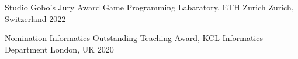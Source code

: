 \begin{cvhonors}
  \cvhonor
    {Studio Gobo's Jury Award} %
    {Game Programming Labaratory, ETH Zurich} %
    {Zurich, Switzerland} %
    {2022} %

  \cvhonor
    {Nomination} %
    {Informatics Outstanding Teaching Award, KCL Informatics Department} %
    {London, UK} %
    {2020} %

\end{cvhonors}